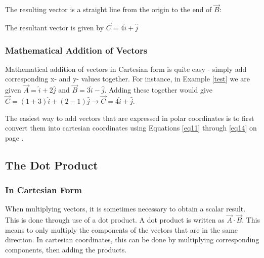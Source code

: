 \begin{mdframed}[backgroundcolor=blue!10!white]
\begin{center}
\begin{tikzpicture}
		\end{tikzpicture}		
		
	\end{center}
	
	The resulting vector is a straight line from the origin to the end of $\vec{B}$: 
	
	
	\begin{center}
		

		
		
		
		
			
			
			
		\end{center}
		
		The resultant vector is given by $\boxed {\vec{C} = 4 \hat{i} + \hat{j}}$
		
	\end{mdframed}
	
	\subsubsection{Mathematical Addition of Vectors}
	Mathematical addition of vectors in Cartesian form is quite easy - simply add corresponding x- and y- values together.  For instance, in Example \ref{test} we are given  $\vec{A} =  \hat{i} + 2 \hat{j} $ and $\vec{B} = 3 \hat{i} - \hat{j} $.  Adding these together would give $\vec{C} = (1 +3) \hat{i} + (2-1)\hat{j} \longrightarrow \vec{C} =  4 \hat{i} + \hat{j} $.
	
	The easiest way to add vectors that are expressed in polar coordinates is to first convert them into cartesian coordinates using Equations \eqref{eq11} through \eqref{eq14} on page \pageref{eq11}.
	
	
	
	\subsection{The Dot Product}  
	\subsubsection{In Cartesian Form}
	When multiplying vectors, it is sometimes necessary to obtain a scalar result.  This is done through use of a dot product.  A dot product is written as $\vec{A} \cdot \vec{B} $.  This means to only multiply the components of the vectors that are in the same direction.  In cartesian coordinates, this can be done by multiplying corresponding components, then adding the products.  
	
